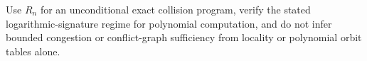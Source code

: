 Use \(R_n\) for an unconditional exact collision program, verify the stated logarithmic-signature regime for polynomial computation, and do not infer bounded congestion or conflict-graph sufficiency from locality or polynomial orbit tables alone.